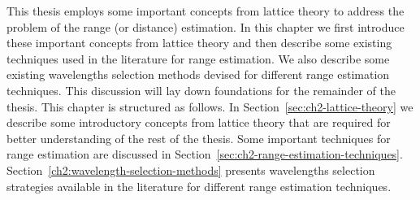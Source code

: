  \label{Chapter2}

This thesis employs some important concepts from lattice theory to address the problem of the range (or distance) estimation. In this chapter we first introduce these important concepts from lattice theory and then describe some existing techniques used in the literature for range estimation. We also describe some existing wavelengths selection methods devised for different range estimation techniques. This discussion will lay down foundations for the remainder of the thesis. This chapter is structured as follows. In Section~\ref{sec:ch2-lattice-theory} we describe some introductory concepts from lattice theory that are required for better understanding of the rest of the thesis. Some important techniques for range estimation are discussed in Section~\ref{sec:ch2-range-estimation-techniques}. Section~\ref{ch2:wavelength-selection-methods} presents wavelengths selection strategies available in the literature for different range estimation techniques.

